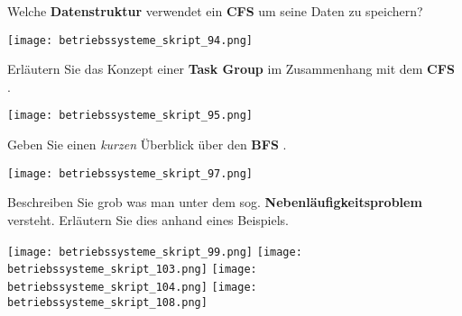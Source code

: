 \documentclass{article}
\begin{document}
\begin{tcolorbox}[colback=white!10!white,colframe=lightgray!75!black,
  savelowerto=\jobname_ex.tex,breakable,enhanced,lines before break=40]

\begin{center}
Welche 
\textbf{Datenstruktur
} verwendet ein 
\textbf{CFS
} um seine Daten zu speichern?

\end{center}

\tcblower

\justifying
\texttt{[image: betriebssysteme\_skript\_94.png]}

\end{tcolorbox}
\begin{tcolorbox}[colback=white!10!white,colframe=lightgray!75!black,
  savelowerto=\jobname_ex.tex,breakable,enhanced,lines before break=40]

\begin{center}
Erläutern Sie das Konzept einer 
\textbf{Task Group
} im Zusammenhang mit dem 
\textbf{CFS
}.

\end{center}

\tcblower

\justifying
\texttt{[image: betriebssysteme\_skript\_95.png]}

\end{tcolorbox}
\begin{tcolorbox}[colback=white!10!white,colframe=lightgray!75!black,
  savelowerto=\jobname_ex.tex,breakable,enhanced,lines before break=40]

\begin{center}
Geben Sie einen 
\textit{kurzen
} Überblick über den 
\textbf{BFS
}.

\end{center}

\tcblower

\justifying
\texttt{[image: betriebssysteme\_skript\_97.png]}

\end{tcolorbox}
\begin{tcolorbox}[colback=white!10!white,colframe=lightgray!75!black,
  savelowerto=\jobname_ex.tex,breakable,enhanced,lines before break=40]

\begin{center}
Beschreiben Sie grob was man unter dem sog. 
\textbf{Nebenläufigkeitsproblem
} versteht. Erläutern Sie dies anhand eines Beispiels.

\end{center}

\tcblower

\justifying
\texttt{[image: betriebssysteme\_skript\_99.png]}
\texttt{[image: betriebssysteme\_skript\_103.png]}
\texttt{[image: betriebssysteme\_skript\_104.png]}
\texttt{[image: betriebssysteme\_skript\_108.png]}

\end{tcolorbox}
\end{document}
